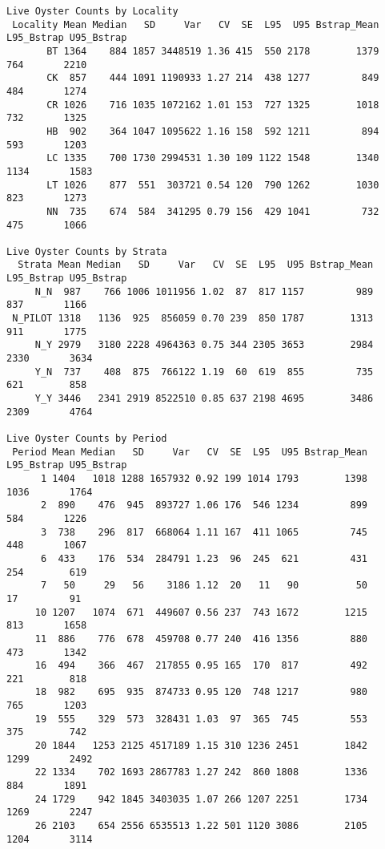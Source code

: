 \documentclass[
]{article}
\begin{document}
\begin{verbatim}
Live Oyster Counts by Locality
 Locality Mean Median   SD     Var   CV  SE  L95  U95 Bstrap_Mean L95_Bstrap U95_Bstrap
       BT 1364    884 1857 3448519 1.36 415  550 2178        1379        764       2210
       CK  857    444 1091 1190933 1.27 214  438 1277         849        484       1274
       CR 1026    716 1035 1072162 1.01 153  727 1325        1018        732       1325
       HB  902    364 1047 1095622 1.16 158  592 1211         894        593       1203
       LC 1335    700 1730 2994531 1.30 109 1122 1548        1340       1134       1583
       LT 1026    877  551  303721 0.54 120  790 1262        1030        823       1273
       NN  735    674  584  341295 0.79 156  429 1041         732        475       1066

Live Oyster Counts by Strata
  Strata Mean Median   SD     Var   CV  SE  L95  U95 Bstrap_Mean L95_Bstrap U95_Bstrap
     N_N  987    766 1006 1011956 1.02  87  817 1157         989        837       1166
 N_PILOT 1318   1136  925  856059 0.70 239  850 1787        1313        911       1775
     N_Y 2979   3180 2228 4964363 0.75 344 2305 3653        2984       2330       3634
     Y_N  737    408  875  766122 1.19  60  619  855         735        621        858
     Y_Y 3446   2341 2919 8522510 0.85 637 2198 4695        3486       2309       4764

Live Oyster Counts by Period
 Period Mean Median   SD     Var   CV  SE  L95  U95 Bstrap_Mean L95_Bstrap U95_Bstrap
      1 1404   1018 1288 1657932 0.92 199 1014 1793        1398       1036       1764
      2  890    476  945  893727 1.06 176  546 1234         899        584       1226
      3  738    296  817  668064 1.11 167  411 1065         745        448       1067
      6  433    176  534  284791 1.23  96  245  621         431        254        619
      7   50     29   56    3186 1.12  20   11   90          50         17         91
     10 1207   1074  671  449607 0.56 237  743 1672        1215        813       1658
     11  886    776  678  459708 0.77 240  416 1356         880        473       1342
     16  494    366  467  217855 0.95 165  170  817         492        221        818
     18  982    695  935  874733 0.95 120  748 1217         980        765       1203
     19  555    329  573  328431 1.03  97  365  745         553        375        742
     20 1844   1253 2125 4517189 1.15 310 1236 2451        1842       1299       2492
     22 1334    702 1693 2867783 1.27 242  860 1808        1336        884       1891
     24 1729    942 1845 3403035 1.07 266 1207 2251        1734       1269       2247
     26 2103    654 2556 6535513 1.22 501 1120 3086        2105       1204       3114
\end{verbatim}
\end{document}
